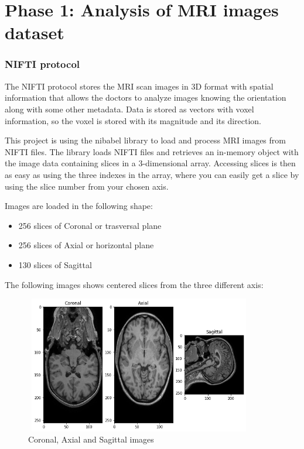 \section{Phase 1: Analysis of MRI images dataset}

\subsubsection*{NIFTI protocol}

The NIFTI protocol stores the MRI scan images in 3D format with spatial information that allows the doctors to analyze images knowing the orientation along with some other metadata. Data is stored as vectors with voxel information, so the voxel is stored with its magnitude and its direction.

This project is using the nibabel \cite{nibabel} library to load and process MRI images from NIFTI files. The library loads NIFTI files and retrieves an in-memory object with the image data containing slices in a 3-dimensional array. Accessing slices is then as easy as using the three indexes in the array, where you can easily get a slice by using the slice number from your chosen axis.

Images are loaded in the following shape:

\begin{itemize}
    \item 256 slices of Coronal or trasversal plane 
    \item 256 slices of Axial or horizontal plane
    \item 130 slices of Sagittal
\end{itemize}

The following images shows centered slices from the three different axis:

\begin{figure}[ht]
    \centering
    \includegraphics[width = 10cm, height = 6cm]{images/3-axis.png}
    \caption[Coronal, Axial and Sagittal images]{Coronal, Axial and Sagittal images}
    \label{fig:3-axis}
\end{figure}

